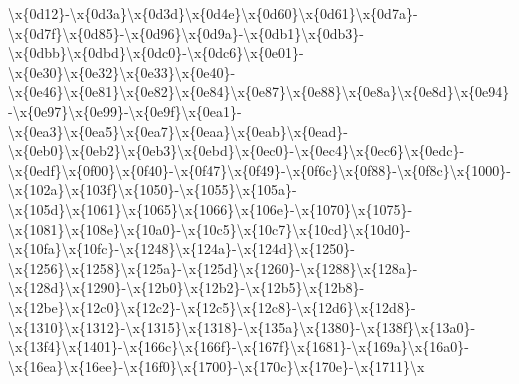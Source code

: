 \begin{DoxyCompactItemize}
\textbackslash{}x\{0d12\}-\/\textbackslash{}x\{0d3a\}\textbackslash{}x\{0d3d\}\textbackslash{}x\{0d4e\}\textbackslash{}x\{0d60\}\textbackslash{}x\{0d61\}\textbackslash{}x\{0d7a\}-\/\textbackslash{}x\{0d7f\}\textbackslash{}x\{0d85\}-\/\textbackslash{}x\{0d96\}\textbackslash{}x\{0d9a\}-\/\textbackslash{}x\{0db1\}\textbackslash{}x\{0db3\}-\/\textbackslash{}x\{0dbb\}\textbackslash{}x\{0dbd\}\textbackslash{}x\{0dc0\}-\/\textbackslash{}x\{0dc6\}\textbackslash{}x\{0e01\}-\/\textbackslash{}x\{0e30\}\textbackslash{}x\{0e32\}\textbackslash{}x\{0e33\}\textbackslash{}x\{0e40\}-\/\textbackslash{}x\{0e46\}\textbackslash{}x\{0e81\}\textbackslash{}x\{0e82\}\textbackslash{}x\{0e84\}\textbackslash{}x\{0e87\}\textbackslash{}x\{0e88\}\textbackslash{}x\{0e8a\}\textbackslash{}x\{0e8d\}\textbackslash{}x\{0e94\}-\/\textbackslash{}x\{0e97\}\textbackslash{}x\{0e99\}-\/\textbackslash{}x\{0e9f\}\textbackslash{}x\{0ea1\}-\/\textbackslash{}x\{0ea3\}\textbackslash{}x\{0ea5\}\textbackslash{}x\{0ea7\}\textbackslash{}x\{0eaa\}\textbackslash{}x\{0eab\}\textbackslash{}x\{0ead\}-\/\textbackslash{}x\{0eb0\}\textbackslash{}x\{0eb2\}\textbackslash{}x\{0eb3\}\textbackslash{}x\{0ebd\}\textbackslash{}x\{0ec0\}-\/\textbackslash{}x\{0ec4\}\textbackslash{}x\{0ec6\}\textbackslash{}x\{0edc\}-\/\textbackslash{}x\{0edf\}\textbackslash{}x\{0f00\}\textbackslash{}x\{0f40\}-\/\textbackslash{}x\{0f47\}\textbackslash{}x\{0f49\}-\/\textbackslash{}x\{0f6c\}\textbackslash{}x\{0f88\}-\/\textbackslash{}x\{0f8c\}\textbackslash{}x\{1000\}-\/\textbackslash{}x\{102a\}\textbackslash{}x\{103f\}\textbackslash{}x\{1050\}-\/\textbackslash{}x\{1055\}\textbackslash{}x\{105a\}-\/\textbackslash{}x\{105d\}\textbackslash{}x\{1061\}\textbackslash{}x\{1065\}\textbackslash{}x\{1066\}\textbackslash{}x\{106e\}-\/\textbackslash{}x\{1070\}\textbackslash{}x\{1075\}-\/\textbackslash{}x\{1081\}\textbackslash{}x\{108e\}\textbackslash{}x\{10a0\}-\/\textbackslash{}x\{10c5\}\textbackslash{}x\{10c7\}\textbackslash{}x\{10cd\}\textbackslash{}x\{10d0\}-\/\textbackslash{}x\{10fa\}\textbackslash{}x\{10fc\}-\/\textbackslash{}x\{1248\}\textbackslash{}x\{124a\}-\/\textbackslash{}x\{124d\}\textbackslash{}x\{1250\}-\/\textbackslash{}x\{1256\}\textbackslash{}x\{1258\}\textbackslash{}x\{125a\}-\/\textbackslash{}x\{125d\}\textbackslash{}x\{1260\}-\/\textbackslash{}x\{1288\}\textbackslash{}x\{128a\}-\/\textbackslash{}x\{128d\}\textbackslash{}x\{1290\}-\/\textbackslash{}x\{12b0\}\textbackslash{}x\{12b2\}-\/\textbackslash{}x\{12b5\}\textbackslash{}x\{12b8\}-\/\textbackslash{}x\{12be\}\textbackslash{}x\{12c0\}\textbackslash{}x\{12c2\}-\/\textbackslash{}x\{12c5\}\textbackslash{}x\{12c8\}-\/\textbackslash{}x\{12d6\}\textbackslash{}x\{12d8\}-\/\textbackslash{}x\{1310\}\textbackslash{}x\{1312\}-\/\textbackslash{}x\{1315\}\textbackslash{}x\{1318\}-\/\textbackslash{}x\{135a\}\textbackslash{}x\{1380\}-\/\textbackslash{}x\{138f\}\textbackslash{}x\{13a0\}-\/\textbackslash{}x\{13f4\}\textbackslash{}x\{1401\}-\/\textbackslash{}x\{166c\}\textbackslash{}x\{166f\}-\/\textbackslash{}x\{167f\}\textbackslash{}x\{1681\}-\/\textbackslash{}x\{169a\}\textbackslash{}x\{16a0\}-\/\textbackslash{}x\{16ea\}\textbackslash{}x\{16ee\}-\/\textbackslash{}x\{16f0\}\textbackslash{}x\{1700\}-\/\textbackslash{}x\{170c\}\textbackslash{}x\{170e\}-\/\textbackslash{}x\{1711\}\textbackslash{}x\
\end{DoxyCompactItemize}
